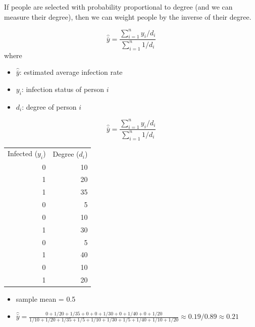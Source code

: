\documentclass[aspectratio=169]{beamer}
\begin{document}
\begin{frame}

If people are selected with probability proportional to degree (and we can measure their degree), then we can weight people by the inverse of their degree.

$$\hat{\bar{y}} = \frac{ \sum_{i=1}^{n} y_i / d_i }{ \sum_{i=1}^{n} 1/ d_i}$$
where
\begin{itemize}
\item $\hat{\bar{y}}$: estimated average infection rate
\item $y_i$: infection status of person $i$
\item $d_i$: degree of person $i$
\end{itemize}

\end{frame}
\begin{frame}

$$\hat{\bar{y}} = \frac{ \sum_{i=1}^{n} y_i / d_i }{ \sum_{i=1}^{n} 1/ d_i}$$

\begin{tabular}{rr}
Infected ($y_i$) & Degree ($d_i$)\\
0 & 10\\
1 & 20\\
1 & 35\\
0 & 5\\
0 & 10\\
1 & 30\\
0 & 5\\
1 & 40\\
0 & 10\\
1 & 20\\
\end{tabular}
\pause
\begin{itemize}
\item sample mean = 0.5 \pause
\item $\hat{\bar{y}} = \frac{ 0 + 1/ 20 + 1/35 + 0 + 0 + 1/30 + 0 + 1/40 + 0 + 1/20 }{ 1/10 + 1/20 + 1/35 + 1/5 + 1/10 + 1/30 + 1/5 + 1/40 + 1/10 + 1/20 } \approx 0.19 / 0.89 \approx  0.21$
\end{itemize}


\end{frame}
\end{document}
